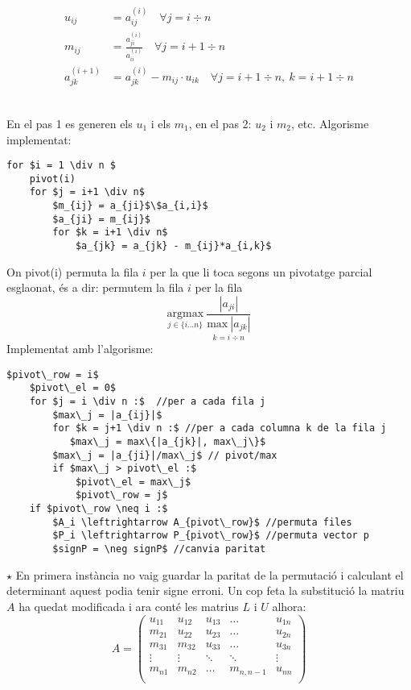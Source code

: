 \documentclass[a4paper,10pt]{article}
\begin{document}
\begin{minipage}{0.6\textwidth}
\begin{align*}
  u_{ij} &= a_{ij}^{(i)} \quad \forall j = i \div n  \\
  m_{ij} &= \frac{a_{ji}^{(i)}}{a_{ii}^{(i)}} \quad \forall j = i+1 \div n   \\
  a_{jk}^{(i+1)} &= a_{jk}^{(i)} - m_{ij}\cdot u_{ik} \quad \forall j = i+1 \div n,\ k = i+1 \div n 
\end{align*}
\end{minipage}
\vspace{\belowdisplayskip} \\
En el pas 1 es generen els $u_1$ i els $m_1$, en el pas 2: $u_2$ i $m_2$, etc. Algorisme implementat:
\begin{lstlisting}[mathescape]
for $i = 1 \div n $
    pivot(i)
    for $j = i+1 \div n$
        $m_{ij} = a_{ji}$\$a_{i,i}$
        $a_{ji} = m_{ij}$
        for $k = i+1 \div n$
            $a_{jk} = a_{jk} - m_{ij}*a_{i,k}$
\end{lstlisting}
On pivot(i) permuta la fila $i$ per la que li toca segons un pivotatge parcial esglaonat, és a dir:
permutem la fila $i$ per la fila
\[
\underset{j \in \{i\dots n\}}{\text{argmax}}\ \frac{|a_{ji}|}{\underset{k=i \div n}{\text{max} \ |a_{jk}|}}
\]
Implementat amb l'algorisme:
\begin{lstlisting}[mathescape]
    $pivot\_row = i$
    $pivot\_el = 0$
    for $j = i \div n :$  //per a cada fila j
        $max\_j = |a_{ij}|$
        for $k = j+1 \div n :$ //per a cada columna k de la fila j
           $max\_j = max\{|a_{jk}|, max\_j\}$
        $max\_j = |a_{ji}|/max\_j$ // pivot/max
        if $max\_j > pivot\_el :$
            $pivot\_el = max\_j$
            $pivot\_row = j$
    if $pivot\_row \neq i :$
        $A_i \leftrightarrow A_{pivot\_row}$ //permuta files
        $P_i \leftrightarrow P_{pivot\_row}$ //permuta vector p
        $signP = \neg signP$ //canvia paritat
\end{lstlisting}
$\star$ En primera instància no vaig guardar la paritat de la permutació i calculant el determinant aquest podia tenir signe erroni. \newpage
Un cop feta la substitució la matriu $A$ ha quedat modificada i ara conté les matrius $L$ i $U$ alhora:
\[
 A = \left(
  \begin{array}{ccccc}
  u_{11}&	u_{12}	& u_{13}&	\ldots	&	u_{1n}	\\
  m_{21}&	u_{22}	& u_{23}&	\ldots	&	u_{2n}	\\
  m_{31}&	m_{32}	& u_{33}&	\ldots	&	u_{3n}	\\
  \vdots&	\vdots	&\ddots	&	\ddots	&	\vdots  \\
  m_{n1}&	m_{n2}	&\ldots	&m_{n,n-1}	&	u_{nn}	\\
  \end{array}
  \right)
\]
\end{document}
